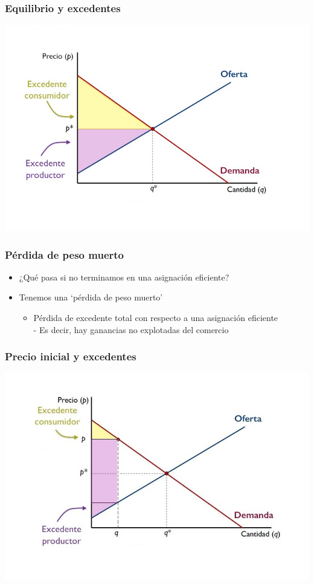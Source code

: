\documentclass{beamer}
\begin{document}
\begin{frame}
\frametitle{Equilibrio y excedentes}
\begin{center}
\includegraphics[scale=0.5]{Slides Principios de Economia/Figures/Tema_07.23_newexcedentes.jpg}
\end{center}
\end{frame}

\begin{frame}
\frametitle{Pérdida de peso muerto}
\begin{itemize}
    \item ¿Qué pasa si no terminamos en una asignación eficiente? 
    \item Tenemos una ‘pérdida de peso muerto’
    \begin{itemize}
        \item Pérdida de excedente total con respecto a una asignación eficiente \\
        - Es decir, hay ganancias no explotadas del comercio
    \end{itemize}
    \end{itemize}
\end{frame}

\begin{frame}
\frametitle{Precio inicial y excedentes}
\includegraphics[scale=0.6]{Slides Principios de Economia/Figures/Tema_07.23_newexcedentes1.jpg}
\end{frame}
\end{document}
